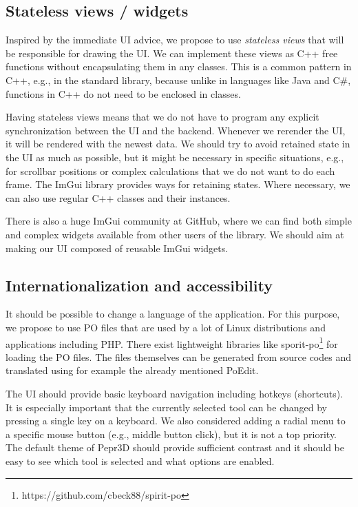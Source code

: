 \vspace{-1em}
\subsection{Stateless views / widgets}

Inspired by the immediate UI advice, we propose to use \emph{stateless views} that will be responsible for drawing the UI.
We can implement these views as C++ free functions without encapsulating them in any classes.
This is a common pattern in C++, e.g., in the standard library, because unlike in languages like Java and C\#, functions in C++ do not need to be enclosed in classes.

Having stateless views means that we do not have to program any explicit synchronization between the UI and the backend.
Whenever we rerender the UI, it will be rendered with the newest data.
We should try to avoid retained state in the UI as much as possible, but it might be necessary in specific situations, e.g., for scrollbar positions or complex calculations that we do not want to do each frame.
The ImGui library provides ways for retaining states.
Where necessary, we can also use regular C++ classes and their instances.

There is also a huge ImGui community at GitHub, where we can find both simple and complex widgets available from other users of the library.
We should aim at making our UI composed of reusable ImGui widgets.

\subsection{Internationalization and accessibility}

It should be possible to change a language of the application.
For this purpose, we propose to use PO files that are used by a lot of Linux distributions and applications including PHP.
There exist lightweight libraries like sporit-po\footnote{https://github.com/cbeck88/spirit-po} for loading the PO files.
The files themselves can be generated from source codes and translated using for example the already mentioned PoEdit.

The UI should provide basic keyboard navigation including hotkeys (shortcuts).
It is especially important that the currently selected tool can be changed by pressing a single key on a keyboard.
We also considered adding a radial menu to a specific mouse button (e.g., middle button click), but it is not a top priority.
The default theme of Pepr3D should provide sufficient contrast and it should be easy to see which tool is selected and what options are enabled.